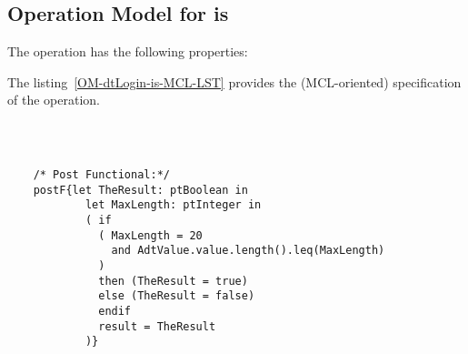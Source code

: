 \subsection{Operation Model for is}

\label{OM-is}


The  operation has the following properties:

	\begin{operationmodel}



		


	\end{operationmodel}



	\vspace{1cm}
	The listing~\ref{OM-dtLogin-is-MCL-LST} provides the \msrmessir (MCL-oriented) specification of the operation.
	
	\scriptsize
	\vspace{0.5cm}
	\begin{lstlisting}[style=MessirStyle,firstnumber=auto,captionpos=b,caption={\msrmessir (MCL-oriented) specification of the operation \emph{is}.},label=OM-dtLogin-is-MCL-LST]

	
	
	/* Post Functional:*/ 
	postF{let TheResult: ptBoolean in
	        let MaxLength: ptInteger in
	        ( if
	          ( MaxLength = 20
	            and AdtValue.value.length().leq(MaxLength)
	          )
	          then (TheResult = true)
	          else (TheResult = false)
	          endif
	          result = TheResult
	        )}
	
	
	\end{lstlisting}
	\normalsize 
	
	
	
	





